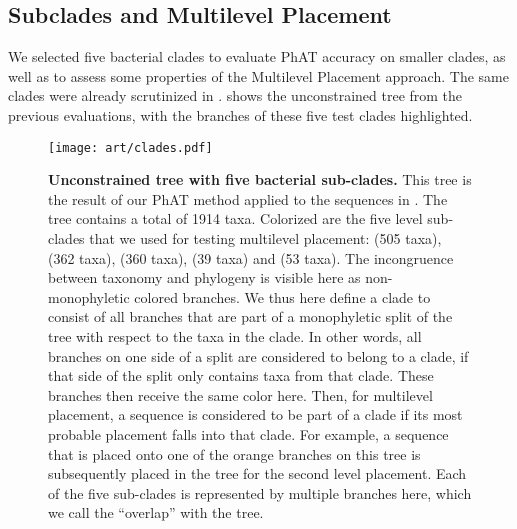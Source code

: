 \subsection{Subclades and Multilevel Placement}
\label{ch:AutomaticTrees:sec:Evaluation:sub:MultilevelPlacement}

We selected five bacterial clades to evaluate \ac{PhAT} accuracy on smaller clades,
as well as to assess some properties of the Multilevel Placement approach.
The same clades were already scrutinized in  \citep{Kozlov2016}.
 shows the unconstrained  tree from the previous evaluations,
with the branches of these five test clades highlighted.

\begin{figure}[hpbt]
    \centering
    \texttt{[image: art/clades.pdf]}
    \vspace*{0.5em}
    \caption[Unconstrained  tree with five bacterial sub-clades]{
        \textbf{Unconstrained  tree with five bacterial sub-clades.}
        This tree is the result of our \ac{PhAT} method
        applied to the  sequences in .
        The tree contains a total of 1914 taxa.
        Colorized are the five  level sub-clades that we used for testing multilevel placement:
         (505 taxa),  (362 taxa),  (360 taxa),
         (39 taxa) and  (53 taxa).
        The incongruence between taxonomy and phylogeny is visible here as non-monophyletic colored branches.
        We thus here define a clade to consist of all branches
        that are part of a monophyletic split of the tree with respect to the taxa in the clade.
        In other words, all branches on one side of a split are considered to belong to a clade,
        if that side of the split only contains taxa from that clade.
        These branches then receive the same color here.
        Then, for multilevel placement, a sequence is considered to be part of a clade
        if its most probable placement falls into that clade.
        For example, a sequence that is placed onto one of the orange branches on this tree
        is subsequently placed in the  tree for the second level placement.
        Each of the five sub-clades is represented by multiple branches here,
        which we call the ``overlap'' with the  tree.
    }
    \label{fig:clades}
\end{figure}

